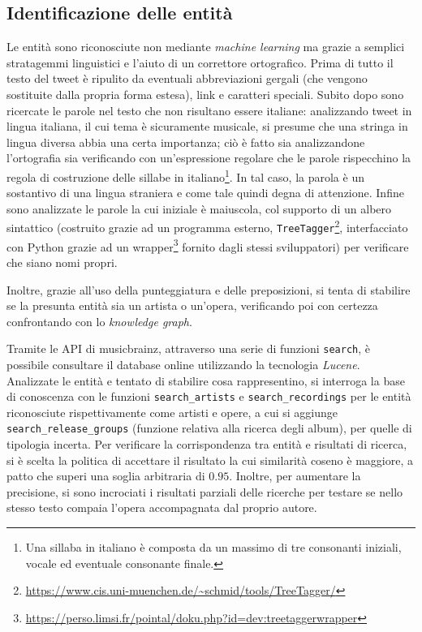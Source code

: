 \documentclass[12pt, a4paper, twocolumn]{article} %
\begin{document}
\subsection{Identificazione delle entità}
Le entità sono riconosciute non mediante \textit{machine learning} ma grazie a semplici stratagemmi linguistici e l'aiuto di un correttore ortografico.
Prima di tutto il testo del tweet è ripulito da eventuali abbreviazioni gergali (che vengono sostituite dalla propria forma estesa), link e caratteri speciali.
Subito dopo sono ricercate le parole nel testo che non risultano essere italiane: analizzando tweet in lingua italiana, il cui tema è sicuramente musicale, si presume che una stringa in lingua diversa abbia una certa importanza; ciò è fatto sia analizzandone l'ortografia sia verificando con un'espressione regolare che le parole rispecchino la regola di costruzione delle sillabe in italiano\footnote{Una sillaba in italiano è composta da un massimo di tre consonanti iniziali, vocale ed eventuale consonante finale\cite{linguistica}.}.
In tal caso, la parola è un sostantivo di una lingua straniera e come tale quindi degna di attenzione.
Infine sono analizzate le parole la cui iniziale è maiuscola, col supporto di un albero sintattico (costruito grazie ad un programma esterno, \verb|TreeTagger|\footnote{\url{https://www.cis.uni-muenchen.de/~schmid/tools/TreeTagger/}}, interfacciato con Python grazie ad un wrapper\footnote{\url{https://perso.limsi.fr/pointal/doku.php?id=dev:treetaggerwrapper}} fornito dagli stessi sviluppatori) per verificare che siano nomi propri.

Inoltre, grazie all'uso della punteggiatura e delle preposizioni, si tenta di stabilire se la presunta entità sia un artista o un'opera, verificando poi con certezza confrontando con lo \textit{knowledge graph}. \newline

Tramite le API di musicbrainz, attraverso una serie di funzioni \verb|search|, è possibile consultare il database online utilizzando la tecnologia \textit{Lucene}.
Analizzate le entità e tentato di stabilire cosa rappresentino, si interroga la base di conoscenza con le funzioni \verb|search_artists| e \verb|search_recordings| per le entità riconosciute rispettivamente come artisti e opere, a cui si aggiunge \verb|search_release_groups| (funzione relativa alla ricerca degli album), per quelle di tipologia incerta.
Per verificare la corrispondenza tra entità e risultati di ricerca, si è scelta la politica di accettare il risultato la cui similarità coseno è maggiore, a patto che superi una soglia arbitraria di $0.95$.
Inoltre, per aumentare la precisione, si sono incrociati i risultati parziali delle ricerche per testare se nello stesso testo compaia l'opera accompagnata dal proprio autore.
\end{document}
